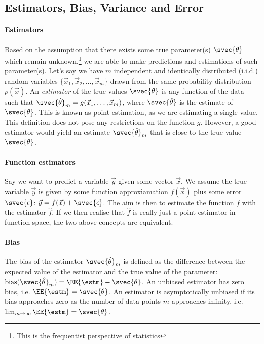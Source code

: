 
        

    \subsection{Estimators, Bias, Variance and Error}

        \paragraph{Estimators} 
        Based on the assumption that there exists some true parameter(s) $\svec{\theta}$ which remain unknown,\footnote{This is the frequentist perspective of statistics} we are able to make predictions and estimations of such parameter(s). Let's say we have $m$ independent and identically distributed (i.i.d.) random variables $\{\vec{x}_1, \vec{x}_2, \dots, \vec{x}_m\}$ drawn from the same probability distribution $p(\vec{x})$. An \textit{estimator} of the true values $\svec{\theta}$ is any function of the data such that $\svec{\hat{\theta}}_m = g(\vec{x}_1,\dots,\vec{x}_m)$, where $\svec{\hat{\theta}}$ is the estimate of $\svec{\theta}$. This is known as point estimation, as we are estimating a single value. This definition does not pose any restrictions on the function $g$. However, a good estimator would yield an estimate $\svec{\hat{\theta}}_m$ that is close to the true value $\svec{\theta}$. 
        \paragraph{Function estimators}
        Say we want to predict a variable $\vec{y}$ given some vector $\vec{x}$. We assume the true variable $\vec{y}$ is given by some function approxiamation $f(\vec{x})$ plus some error $\svec{\epsilon}$: $\vec{y} = f(\vec{x}) + \svec{\epsilon}$. The aim is then to estimate the function $f$ with the estimator $\hat{f}$. If we then realise that $\hat{f}$ is really just a point estimator in function space, the two above concepts are equivalent.

        \paragraph{Bias}
        The bias of the estimator $\svec{\hat{\theta}}_m$ is defined as the difference between the expected value of the estimator and the true value of the parameter: $\text{bias}(\svec{\hat{\theta}}_m) = \EE{\estm} - \svec{\theta}$. An unbiased estimator has zero bias, i.e. $\EE{\estm} = \svec{\theta}$. An estimator is asymptotically unbiased if its bias approaches zero as the number of data points $m$ approaches infinity, i.e. $\lim_{m\to\infty} \EE{\estm} = \svec{\theta}$.

